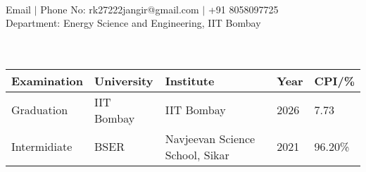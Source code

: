 \documentclass{article}
\begin{document}
\vspace*{-6cm}
\\  Email $\vert$ Phone No: rk27222jangir@gmail.com $\vert$ +91 8058097725\\     Department: Energy Science and Engineering, IIT Bombay            \\

\noindent {}\\[\lsep] \\
\begin{tabular}{ l @{\hskip 0.75in} l @{\hskip 0.75in} l @{\hskip 0.5in} l @{\hskip 0.25in} l }
\hline
\textbf{Examination} & \textbf{University} & \textbf{Institute} & \textbf{Year} & \textbf{CPI/\%} \\[0.025cm]

\hline
Graduation & IIT Bombay & IIT Bombay & 2026 & 7.73\\


Intermidiate & BSER & Navjeevan Science School, Sikar & 2021 & 96.20\%\\
\hline
\end{tabular}
\\[0.05cm]
\begin{table}
    \begin{minipage}{0.15\linewidth}
        \centering
    \end{minipage}
    \begin{minipage}{0.65\linewidth}
        \setlength{\tabcolsep}{70pt}
        \def\arraystretch{1.15}
        \begin{tabular}{ll}
        \end{tabular}
    \end{minipage}\hfill
\end{table} 

\vspace{-2.5pt}
\end{document}
